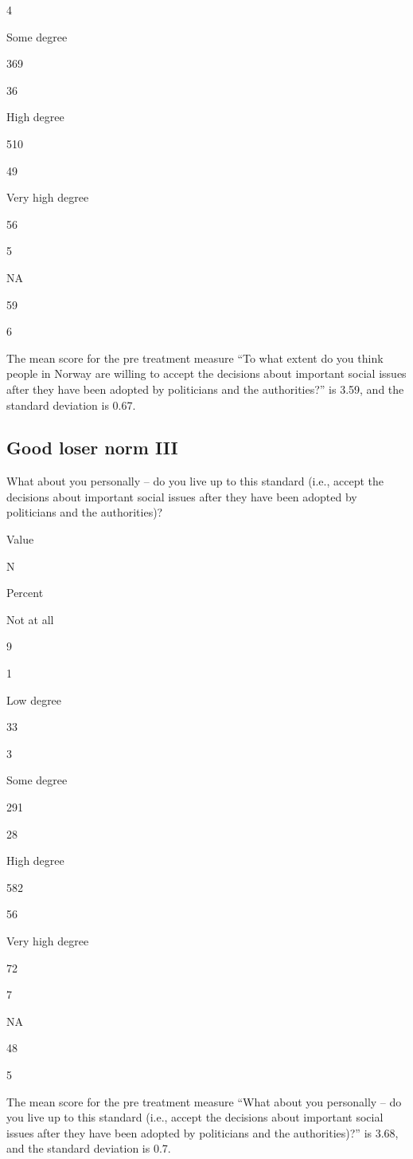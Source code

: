 \documentclass[
]{book}
\begin{document}
4

Some degree

369

36

High degree

510

49

Very high degree

56

5

NA

59

6

The mean score for the pre treatment measure ``To what extent do you
think people in Norway are willing to accept the decisions about
important social issues after they have been adopted by politicians and
the authorities?'' is 3.59, and the standard deviation is 0.67.

\hypertarget{good-loser-norm-iii}{%
\subsection{Good loser norm III}\label{good-loser-norm-iii}}

What about you personally -- do you live up to this standard (i.e.,
accept the decisions about important social issues after they have been
adopted by politicians and the authorities)?

Value

N

Percent

Not at all

9

1

Low degree

33

3

Some degree

291

28

High degree

582

56

Very high degree

72

7

NA

48

5

The mean score for the pre treatment measure ``What about you personally
-- do you live up to this standard (i.e., accept the decisions about
important social issues after they have been adopted by politicians and
the authorities)?'' is 3.68, and the standard deviation is 0.7.
\end{document}
